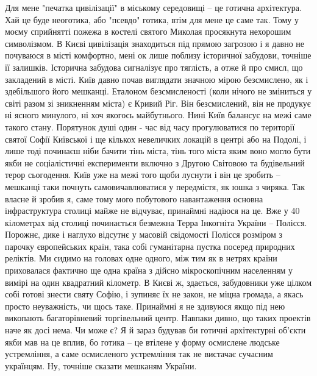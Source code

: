 Для мене "печатка цивілізації" в міському середовищі – це готична архітектура. Хай це буде неоготика, або "псевдо" готика, втім для мене це саме так. Тому у моєму сприйнятті пожежа в костелі святого Миколая просякнута нехорошим символізмом. В Києві цивілізація знаходиться під прямою загрозою і я давно не почуваюся в місті комфортно, мені ок лише поблизу історичної забудови, точніше її залишків. 
Історична забудова сигналізує про тяглість, а отже й про смисл, що закладений в місті. Київ давно почав виглядати значною мірою безсмислено, як і здебільшого його мешканці. Еталоном безсмисленості (коли нічого не зміниться у світі разом зі зникненням міста) є Кривий Ріг. Він безсмислений, він не продукує ні ясного минулого, ні хоч якогось майбутнього. Нині Київ балансує на межі саме такого стану. 
Порятунок душі один - час від часу прогулюватися по території святої Софії Київської і ще кількох невеличких локацій в центрі або на Подолі, і лише тоді починаєш ніби бачити тінь міста, тінь того міста яким воно могло бути якби не соціалістичні експерименти включно з Другою Світовою та  будівельний терор сьогодення. 
Київ уже на межі того щоби луснути і він це зробить – мешканці таки почнуть самовичавлюватися у передмістя, як юшка з чиряка. Так власне й зробив я, саме тому мого побутового навантаження основна інфраструктура столиці майже не відчуває, принаймні надіюся на це.
Вже у 40 кілометрах від столиці починається безмежна Терра Інкогніта України – Полісся. Порожнє, дике і наглухо відсутнє у масовій свідомості Полісся розміром з парочку європейських країн, така собі гуманітарна пустка посеред природних реліктів. Ми сидимо на головах одне одного, між тим як в нетрях країни приховалася фактично ще одна країна з дійсно мікроскопічним населенням у вимірі на один квадратний кілометр.
В Києві ж, здається, забудовники уже цілком собі готові знести святу Софію, і зупиняє їх не закон, не міцна громада, а якась просто неуважність, чи щось таке. Принаймні я не здивуюся якщо під нею викопають багаторівневий торгівельний центр. Навпаки дивно, що таких проектів наче як досі нема.
Чи може є? 
Я й зараз будував би готичні архітектурні об'єкти якби мав на це вплив, бо готика – це втілене у форму осмислене людське устремління, а саме осмисленого устремління так не вистачає сучасним українцям. Ну, точніше сказати мешканям України.
